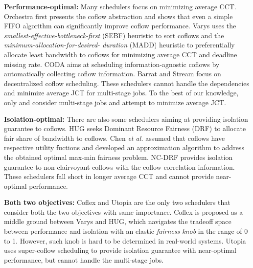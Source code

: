 \documentclass[10pt, conference, letterpaper]{IEEEtran}
\begin{document}
\noindent\textbf{Performance-optimal:} Many schedulers focus on minimizing average CCT. Orchestra\cite{orchestra} first presents the coflow abstraction and shows that even a simple FIFO algorithm can significantly improve coflow performance. Varys\cite{varys} uses the \emph{smallest-effective-bottleneck-first} (SEBF) heuristic to sort coflows and the \emph{minimum-allocation-for-desired- duration} (MADD) heuristic to preferentially allocate least bandwidth to coflows for minimizing average CCT and deadline missing rate. CODA\cite{coda} aims at scheduling information-agnostic coflows by automatically collecting coflow information. Barrat\cite{barrat} and Stream\cite{stream} focus on decentralized coflow scheduling. These schedulers cannot handle the dependencies and minimize average JCT for multi-stage jobs. To the best of our knowledge, only \cite{aalo} and \cite{bingchuan} consider multi-stage jobs and attempt to minimize average JCT. 

\noindent\textbf{Isolation-optimal:} There are also some schedulers aiming at providing isolation guarantee to coflows. HUG\cite{HUG} seeks Dominant Resource Fairness (DRF)\cite{DRF} to allocate fair share of bandwidth to coflows. Chen \emph{et al.}\cite{optimizing} assumed that coflows have respective utility fuctions and developed an approximation algorithm to address the obtained optimal max-min fairness problem. NC-DRF\cite{fair} provides isolation guarantee to non-clairvoyant coflows with the coflow correlation information. These schedulers fall short in longer average CCT and cannot provide near-optimal performance.

\noindent\textbf{Both two objectives:} Coflex\cite{coflex} and Utopia\cite{utopia} are the only two schedulers that consider both the two objectives with same importance. Coflex is proposed as a middle ground between Varys and HUG, which navigates the tradeoff space between performance and isolation with an elastic \emph{fairness knob} in the range of 0 to 1. However, such knob is hard to be determined in real-world systems. Utopia uses super-coflow scheduling to provide isolation guarantee with near-optimal performance, but cannot handle the multi-stage jobs.
\end{document}
